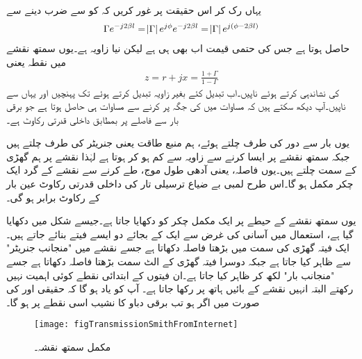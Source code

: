یہاں رک کر اس حقیقت پر غور کریں کہ  کو  سے ضرب دینے سے
\begin{align*}
\Gamma e^{-j2 \beta l}= \abs{\Gamma} e^{j \phi} e^{-j 2 \beta l}= \abs{\Gamma} e^{j(\phi-2\beta l)}
\end{align*}
حاصل ہوتا ہے جس کی حتمی قیمت اب بھی  ہی ہے  لیکن نیا زاویہ  ہے۔یوں سمتھ نقشے میں نقطہ  یعنی 
\begin{align}\label{مساوات_ترسیلی_داخلی_رکاوٹ_سمتھ_پ}
z=r+j x=\frac{1+\Gamma}{1-\Gamma}
\end{align}
کی نشاندہی کرتے ہوئے   ناپیں۔اب  تبدیل کئے بغیر زاویہ تبدیل کرتے ہوئے  تک پہنچیں اور یہاں سے   ناپیں۔آپ دیکھ سکتے ہیں کہ مساوات  میں  کی جگہ  پر کرنے سے مساوات  ہی حاصل ہوتا ہے جو برقی بار سے  فاصلے پر بمطابق  داخلی قدرتی رکاوٹ ہے۔

یوں بار  سے دور  کی طرف چلتے ہوئے، ہم منبع طاقت یعنی جنریٹر کی طرف چلتے ہیں جبکہ سمتھ نقشے پر ایسا کرنے سے زاویہ  سے کم ہو کر  ہوتا ہے لہٰذا نقشے پر ہم گھڑی کے سمت چلتے ہیں۔یوں  فاصلہ، یعنی آدھی طول موج، طے کرنے سے نقشے کے گرد ایک چکر مکمل ہو گا۔اس طرح  لمبی  بے ضیاع ترسیلی تار کی داخلی قدرتی رکاوٹ عین بار کے رکاوٹ برابر ہو گی۔

یوں سمتھ نقشے کے حیطے پر ایک مکمل چکر کو  دکھایا جاتا ہے۔جیسے شکل  میں دکھایا گیا ہے، استعمال میں آسانی کی غرض سے ایک کے بجائے دو ایسے  فیتے بنائے جاتے ہیں۔ایک فیتہ گھڑی کی سمت میں بڑھتا فاصلہ دکھاتا ہے جسے نقشے میں "منجانب جنریٹر" سے ظاہر کیا جاتا ہے جبکہ دوسرا فیتہ گھڑی کے الٹ سمت بڑھتا فاصلہ دکھاتا ہے جسے "منجانب بار" لکھ کر ظاہر کیا جاتا ہے۔ان فیتوں کے ابتدائی نقطے کوئی اہمیت نہیں رکھتے البتہ انہیں نقشے کے بائیں ہاتھ پر رکھا جاتا ہے۔ آپ کو یاد ہو گا کہ حقیقی  اور  کی صورت میں اگر  ہو تب برقی دباو کا نشیب اسی نقطے پر ہو گا۔
\begin{figure}
\centering
\texttt{[image: figTransmissionSmithFromInternet]}
\caption{مکمل سمتھ نقشہ۔}
\label{شکل_ترسیلی_مکمل_سمتھ_نقشہ}
\end{figure} 

